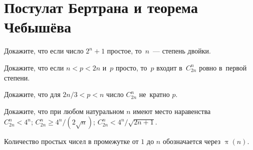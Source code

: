 
\section*{Постулат Бертрана и теорема Чебышёва}


\begingroup
    \ifdefined\mathup
        \def\pifunc{\mathup{\pi}}%
    \else
        \def\pifunc{\uppi}%
    \fi

\begin{problems}

\item
Докажите, что если число $2^n + 1$ простое, то~$n$~--- степень двойки.

\item
Докажите, что если $n < p < 2 n$ и~$p$ просто, то~$p$ входит в~$C_{2n}^n$
ровно в~первой степени.

\item
Докажите, что для $2 n / 3 < p < n$ число $C_{2n}^n$ не~кратно $p$.

\item
Докажите, что при любом натуральном $n$ имеют место наравенства
\\
\subproblem $C_{2n}^{n} < 4^{n}$;
\qquad
\subproblem $C_{2n}^{n} \geq 4^{n} / (2 \sqrt{n})$;
\qquad
\subproblem $C_{2n}^{n} < 4^{n} / \sqrt{2 n + 1}$.

\end{problems}

Количество простых чисел в промежутке от $1$ до $n$ обозначается через
$\pifunc(n)$.

